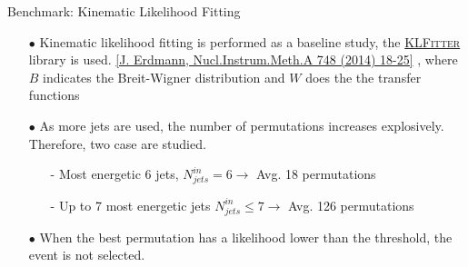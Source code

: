 \makeatletter
  \graphicspath{ {@path} }
\makeatother

\begin{frame}[fragile]{Benchmark: Kinematic Likelihood Fitting}
  \begin{itemize}
    \item[$\bullet$]
        Kinematic likelihood fitting is performed as a baseline study,
        the \href{https://github.com/KLFitter/KLFitter}{\textsc{KLFitter}} library is used.
        {\scriptsize \href{https://www.sciencedirect.com/science/article/pii/S0168900214001855?via\%3Dihub}{[J. Erdmann, Nucl.Instrum.Meth.A 748 (2014) 18-25]}}
        ,
        {\footnotesize where $B$ indicates the Breit-Wigner distribution and $W$ does the the transfer functions}
    \smallskip

    \item[$\bullet$]
        As more jets are used, the number of permutations increases explosively.
        Therefore, two case are studied.
              \begin{itemize}
                  \item[-] Most energetic 6 jets, $N_{jets}^{in} = 6 \rightarrow $ Avg. 18 permutations
                  \item[-] Up to 7 most energetic jets $N_{jets}^{in} \leq 7 \rightarrow$  Avg. 126 permutations
              \end{itemize}
    \smallskip

    \item[$\bullet$]
        When the best permutation has a likelihood lower than the threshold, the event is not selected.
  \end{itemize}

\end{frame}




